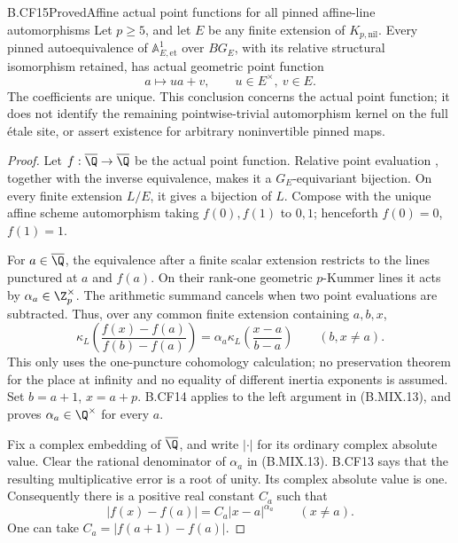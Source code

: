 \begin{claim}{B.CF15}{Proved}{Affine actual point functions for all pinned affine-line automorphisms}
Let \(p\geq5\), and let \(E\) be any finite extension
of \(K_{p,\mathrm{nil}}\). Every pinned autoequivalence
of \(\mathbb A^1_{E,\mathrm{et}}\) over \(BG_E\), with
its relative structural isomorphism retained, has actual
geometric point function
\[
                         a\longmapsto ua+v,
                 \qquad u\in E^\times,\ v\in E.          \tag{B.MIX.12}
\]
The coefficients are unique. This conclusion concerns the
actual point function; it does not identify the remaining
pointwise-trivial automorphism kernel on the full étale site,
or assert existence for arbitrary noninvertible pinned maps.
\end{claim}
\begin{proof}
Let \(f:\overline\Q\to\overline\Q\) be the actual point
function. Relative point evaluation
\citep[Proposition~3.6]{CarlsonHaineWolf2024}, together with
the inverse equivalence, makes it a \(G_E\)-equivariant
bijection. On every finite extension \(L/E\), it gives a
bijection of \(L\). Compose with the unique affine scheme
automorphism taking \(f(0),f(1)\) to \(0,1\); henceforth
\(f(0)=0\), \(f(1)=1\).

For \(a\in\overline\Q\), the equivalence after a finite
scalar extension restricts to the lines punctured at
\(a\) and \(f(a)\). On their rank-one geometric
\(p\)-Kummer lines it acts by
\(\alpha_a\in\Z_p^\times\). The arithmetic summand
cancels when two point evaluations are subtracted. Thus,
over any common finite extension containing \(a,b,x\),
\[
 \kappa_L\!\left(\frac{f(x)-f(a)}{f(b)-f(a)}\right)
       =\alpha_a\kappa_L\!\left(\frac{x-a}{b-a}\right)
       \qquad (b,x\ne a).                              \tag{B.MIX.13}
\]
This only uses the one-puncture cohomology calculation;
no preservation theorem for the place at infinity and
no equality of different inertia exponents is assumed.
Set \(b=a+1\), \(x=a+p\). B.CF14 applies to the left
argument in (B.MIX.13), and proves
\(\alpha_a\in\Q^\times\) for every \(a\).

Fix a complex embedding of \(\overline\Q\), and write
\(|\cdot|\) for its ordinary complex absolute value.
Clear the rational denominator of \(\alpha_a\) in
(B.MIX.13). B.CF13 says that the resulting multiplicative
error is a root of unity. Its complex absolute value is one.
Consequently there is a positive real constant \(C_a\)
such that
\[
                 |f(x)-f(a)|=C_a|x-a|^{\alpha_a}
                       \qquad(x\ne a).                  \tag{B.MIX.14}
\]
One can take \(C_a=|f(a+1)-f(a)|\).


\end{proof}
